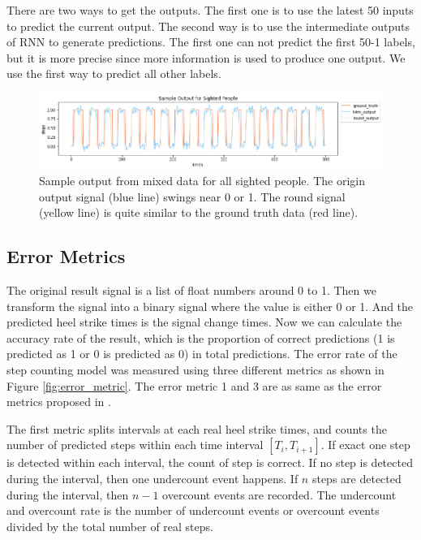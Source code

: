 \documentclass[11pt]{article}
\begin{document}
{There are two ways to get the outputs. The first one is to use the latest 50 inputs to predict the current output. The second way is to use the intermediate outputs of RNN to generate predictions. The first one can not predict the first 50-1 labels, but it is more precise since more information is used to produce one output. We use the first way to predict all other labels.


\begin{figure}[ht]
\centering
\includegraphics[scale=0.5]{output_sighted}
\caption{Sample output from mixed data for all sighted people. The origin output signal (blue line) swings near 0 or 1. The round signal (yellow line) is quite similar to the ground truth data (red line).}
\label{fig:output_sighted}
\end{figure}



\subsection{Error Metrics}

The original result signal is a list of float numbers around 0 to 1. Then we transform the signal into a binary signal where the value is either 0 or 1. And the predicted heel strike times is the signal change times. Now we can calculate the accuracy rate of the result, which is the proportion of correct predictions (1 is predicted as 1 or 0 is predicted as 0) in total predictions. The error rate of the step counting model was measured using three different metrics as shown in Figure \ref{fig:error_metric}. The error metric 1 and 3 are as same as the error metrics proposed in \cite{flores2016weallwalk}.

The first metric splits intervals at each real heel strike times, and counts the number of predicted steps within each time interval $[T_i, T_{i+1}]$.  If exact one step is detected within each interval, the count of step is correct. If no step is detected during the interval, then one undercount event happens. If $n$ steps are detected during the interval, then $n-1$ overcount events are recorded. The undercount and overcount rate is the number of undercount events or overcount events divided by the total number of real steps.

}
\end{document}
